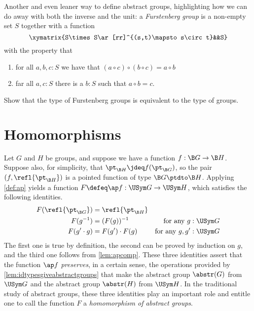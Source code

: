 \begin{xca}
  Another and even leaner way to define abstract groups, highlighting how we can do away with both the inverse and the unit: a \emph{Furstenberg group}
  is a non-empty set $S$ together with a function
  $$\xymatrix{S\times S\ar[rr]^{(s,t)\mapsto s\circ t}&&S}
  $$
  with the property that
  \begin{enumerate}
  \item for all $a,b,c:S$ we have that $(a\circ c)\circ(b\circ c)=a\circ b$
  \item far all $a,c:S$ there is a $b:S$ such that $a\circ b=c$.
  \end{enumerate}
  Show that the type of Furstenberg groups is equivalent to the type of groups.
\end{xca}

\section{Homomorphisms}
\label{sec:homomorphisms}

\begin{remark}\label{homom-idens}
Let $G$ and $H$ be groups, and suppose we have a function $f : \B G \to \B H$.
Suppose also, for simplicity, that $\pt_{\B H} \jdeq f ( \pt_{\B G} ) $, so the pair $(f, \refl {\pt_{\B H}})$ is a pointed function of type $\B G \ptdto \B H$.
Applying \cref{def:ap} yields a function $F \defeq \ap f : \USym G \to \USym H$, which satisfies the following identities.
\begin{align*}
  F ( \refl {\pt_{\B G}} ) & = \refl{\pt_{\B H}}                               \\
  F (g ^ {-1})     & = (F (g))^{-1}         & \text {for any $g : \USym G$}    \\
  F (g' \cdot g)   & =  F (g') \cdot  F (g) & \text {for any $g, g' : \USym G$}
\end{align*}
The first one is true by definition, the second can be proved by induction on $g$, and the third one follows from \cref{lem:apcomp}.
These three identities assert that the function $\ap f$ \emph{preserves}, in a certain sense, the operations provided by \cref{lem:idtypesgiveabstractgroups} that
make the abstract group $\abstr(G)$ from $\USym G$ and the abstract group $\abstr(H)$ from $\USym H$.
In the traditional study of abstract groups, these three identities play an important role and entitle one to call the function $F$ a
\emph{homomorphism of abstract groups}.
\end{remark}

